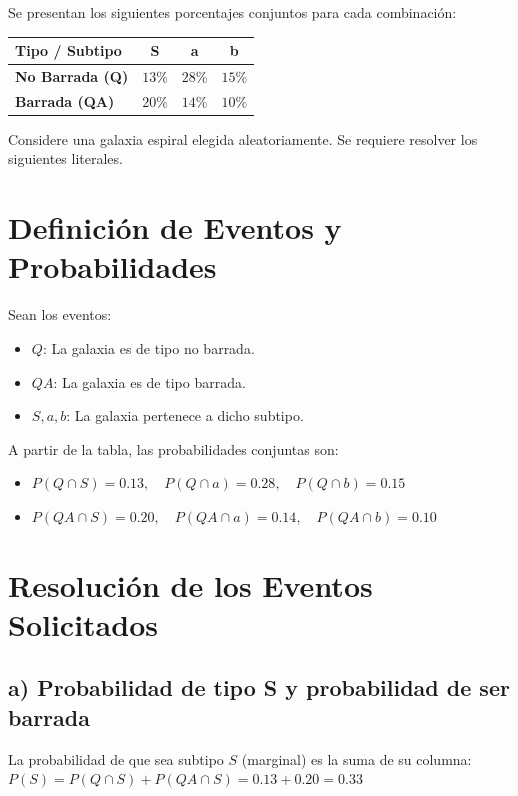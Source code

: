 \documentclass[12pt]{article}
\begin{document}
Se presentan los siguientes porcentajes conjuntos para cada combinación:

\begin{center}
\begin{tabular}{|l|c|c|c|}
\hline
\textbf{Tipo / Subtipo} & \textbf{S} & \textbf{a} & \textbf{b} \\ \hline
\textbf{No Barrada (Q)} & $13\%$ & $28\%$ & $15\%$ \\ \hline
\textbf{Barrada (QA)}   & $20\%$ & $14\%$ & $10\%$ \\ \hline
\end{tabular}
\end{center}

Considere una galaxia espiral elegida aleatoriamente. Se requiere resolver los siguientes literales.

\section{Definición de Eventos y Probabilidades}
Sean los eventos:
\begin{itemize}
    \item $Q$: La galaxia es de tipo no barrada.
    \item $QA$: La galaxia es de tipo barrada.
    \item $S, a, b$: La galaxia pertenece a dicho subtipo.
\end{itemize}

A partir de la tabla, las probabilidades conjuntas son:
\begin{itemize}
    \item $P(Q \cap S) = 0.13, \quad P(Q \cap a) = 0.28, \quad P(Q \cap b) = 0.15$
    \item $P(QA \cap S) = 0.20, \quad P(QA \cap a) = 0.14, \quad P(QA \cap b) = 0.10$
\end{itemize}

\section{Resolución de los Eventos Solicitados}

\subsection*{a) Probabilidad de tipo S y probabilidad de ser barrada}
La probabilidad de que sea subtipo $S$ (marginal) es la suma de su columna:
$P(S) = P(Q \cap S) + P(QA \cap S) = 0.13 + 0.20 = \mathbf{0.33}$
\end{document}

